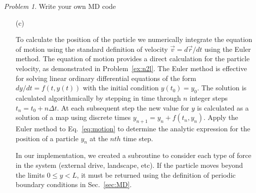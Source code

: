 \documentclass[preprint,showpacs,preprintnumbers,amsmath,amssymb,aps,prb]{revtex4-1}
\theoremstyle{remark}
\newtheorem{problem}{Problem}
\begin{document}
\begin{problem}{Write your own MD code}
\begin{enumerate}
\begin{verbatim}
#integer time steps
dict[`maxtime']=int(40/dict['freq'])   #total time steps 
dict[`writemovietime']=1   #write data to arrays for plotting
\end{verbatim}
    
    In the subroutine {\bf single\_particle()}
    calculate the array lengths to hold
    position, velocity, and time data.
    Define a loop to 
    calculate the particle position and velocity through each
    molecular dynamics time step,
    calculated in the subroutine {\bf md\_step()}
    (which will be described in more detail in (c)).

\begin{verbatim}
def single_particle(parameters,plot="y-position"):
    ```Run MD simulation...'''    
    #define empty arrays to hold data as a function of time
    #(left as an exercise to the reader)   

    #loop through the integer time steps in the simulation
    for int_time in range(0,maxtime):
        #(left as an exercise to the reader)
        time += dt
      
\end{verbatim}

\item[(c)]

  To calculate the position of the particle we
  numerically integrate the equation of motion using
  the standard definition of velocity
  $\vec{v} = d\vec{r}/dt$ 
  using the 
  Euler method. 
  The equation of motion provides
  a direct calculation for the particle velocity,
  as demonstrated in Problem~\ref{ex:n2l}.  
  The Euler method is effective for solving linear ordinary differential  equations
  of the form
  $dy/dt = f(t,y(t))$ with the initial condition $y(t_0) = y_0$.
  The solution is calculated algorithmically
  by stepping in time through $n$ integer steps
  $t_n = t_0 + n \Delta t$.
  At each subsequent step the new
  value for $y$ is calculated as a  solution of a map using
  discrete times 
  $y_{n+1} = y_n + f(t_n,y_n)$.
  Apply the Euler method to %
  Eq.~\ref{eq:motion}
  to determine  the analytic expression
  for the position of a particle
  $y_n$ at the $nth$ time step.

  In our implementation,
  we created a subroutine to consider each
  type of force in the system (external drive, landscape, etc).
  If the particle moves beyond the limits
  $0 \le y < L$,
  it must be returned 
  using the definition of periodic boundary conditions
  in Sec.~\ref{sec:MD}.


\end{enumerate}
\end{problem}
\end{document}

